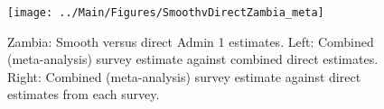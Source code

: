 \documentclass[12pt]{article}\usepackage[]{graphicx}\usepackage[]{color}
\newenvironment{knitrout}{}{} %
\begin{document}

\begin{knitrout}
\color{fgcolor}\begin{figure}[bht]

{\centering \texttt{[image: ../Main/Figures/SmoothvDirectZambia\_meta]} 

}

\caption[Zambia]{Zambia: Smooth versus direct Admin 1 estimates. Left: Combined (meta-analysis) survey estimate against combined direct estimates. Right: Combined (meta-analysis) survey estimate against direct estimates from each survey.}\label{fig:unnamed-chunk-333}
\end{figure}


\end{knitrout}
\end{document}
